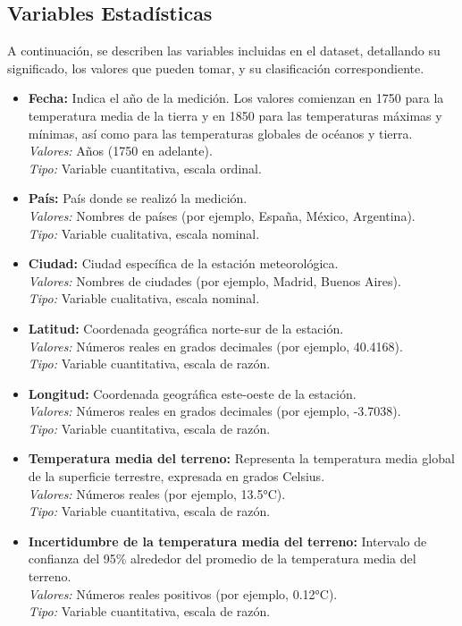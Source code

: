 \documentclass[12pt,a4paper]{scrartcl}
\begin{document}
\subsection{Variables Estadísticas}
A continuación, se describen las variables incluidas en el dataset, detallando su significado, los valores que pueden tomar, y su clasificación correspondiente.
\begin{itemize}
    \item \textbf{Fecha:} Indica el año de la medición. Los valores comienzan en 1750 para la temperatura media de la tierra y en 1850 para las temperaturas máximas y mínimas, así como para las temperaturas globales de océanos y tierra. \\
    \textit{Valores:} Años (1750 en adelante). \\
    \textit{Tipo:} Variable cuantitativa, escala ordinal.

    \item \textbf{País:} País donde se realizó la medición. \\
    \textit{Valores:} Nombres de países (por ejemplo, España, México, Argentina). \\
    \textit{Tipo:} Variable cualitativa, escala nominal.

    \item \textbf{Ciudad:} Ciudad específica de la estación meteorológica. \\
    \textit{Valores:} Nombres de ciudades (por ejemplo, Madrid, Buenos Aires). \\
    \textit{Tipo:} Variable cualitativa, escala nominal.

    \item \textbf{Latitud:} Coordenada geográfica norte-sur de la estación. \\
    \textit{Valores:} Números reales en grados decimales (por ejemplo, 40.4168). \\
    \textit{Tipo:} Variable cuantitativa, escala de razón.

    \item \textbf{Longitud:} Coordenada geográfica este-oeste de la estación. \\
    \textit{Valores:} Números reales en grados decimales (por ejemplo, -3.7038). \\
    \textit{Tipo:} Variable cuantitativa, escala de razón.

    \item \textbf{Temperatura media del terreno:} Representa la temperatura media global de la superficie terrestre, expresada en grados Celsius. \\
    \textit{Valores:} Números reales (por ejemplo, 13.5°C). \\
    \textit{Tipo:} Variable cuantitativa, escala de razón.

    \item \textbf{Incertidumbre de la temperatura media del terreno:} Intervalo de confianza del 95\% alrededor del promedio de la temperatura media del terreno. \\
    \textit{Valores:} Números reales positivos (por ejemplo, 0.12°C). \\
    \textit{Tipo:} Variable cuantitativa, escala de razón.
\end{itemize}
 
\end{document}
